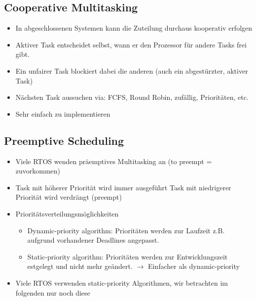 \subsection{Cooperative Multitasking}
\begin{itemize}
  \item In abgeschlossenen Systemen kann die Zuteilung durchaus kooperativ erfolgen
  \item Aktiver Task entscheidet selbst, wann er den Prozessor für andere Tasks frei gibt.
  \item Ein unfairer Task blockiert dabei die anderen (auch ein abgestürzter, aktiver Task)
  \item Nächsten Task aussuchen via: FCFS, Round Robin, zufällig, Prioritäten, etc.
  \item Sehr einfach zu implementieren
\end{itemize}

\subsection{Preemptive Scheduling}
\begin{itemize}
  \item Viele RTOS wenden präemptives Multitasking an (to preempt = zuvorkommen)
  \item Task mit höherer Priorität wird immer ausgeführt Task mit niedrigerer Priorität wird verdrängt (preempt)
  \item Prioritätsverteilungsmöglichkeiten
  \begin{itemize}
    \item Dynamic-priority algorithm: Prioritäten werden zur Laufzeit z.B. aufgrund vorhandener Deadlines angepasst.
    \item Static-priority algorithm: Prioritäten werden zur Entwicklungszeit estgelegt und nicht mehr geändert. $\rightarrow$ Einfacher als dynamic-priority
  \end{itemize}
  \item Viele RTOS verwenden static-priority Algorithmen, wir betrachten im folgenden nur noch diese
\end{itemize}

